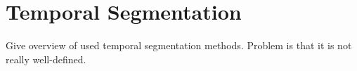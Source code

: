 \section{Temporal Segmentation}\label{sec:temporal_segmentation}

Give overview of used temporal segmentation methods. Problem is that it is not really well-defined.